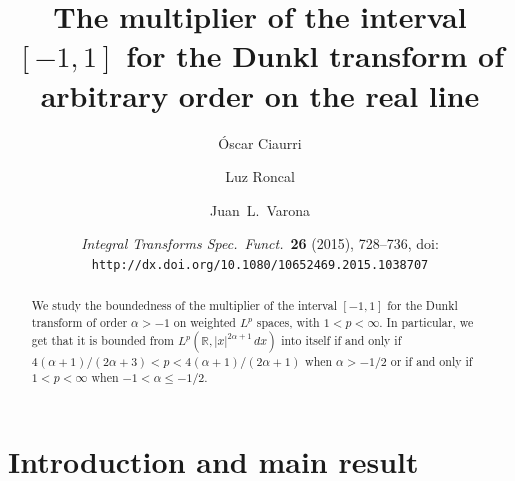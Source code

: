 \documentclass[a4paper]{amsart}
\numberwithin{equation}{section}
\theoremstyle{plain}
\theoremstyle{remark}
\begin{document}
\title[The multiplier of {$[-1,1]$} for the Dunkl transform]%
{The multiplier of the interval $[-1,1]$ for the Dunkl transform of arbitrary order on the real line}

\author[\'O. Ciaurri]{\'Oscar Ciaurri}
\address{Departamento de Matem\'aticas y Computaci\'on,
Universidad de La Rioja, 26004 Lo\-gro\-\~no, Spain}

\author[L. Roncal]{Luz Roncal}
\address{Departamento de Matem\'aticas y Computaci\'on,
Universidad de La Rioja, 26004 Lo\-gro\-\~no, Spain}

\author[J. L. Varona]{Juan~L.~Varona}
\address{Departamento de Matem\'aticas y Computaci\'on,
Universidad de La Rioja, 26004 Lo\-gro\-\~no, Spain}


\renewcommand{\datename}{\textbf{THIS PAPER HAS BEEN PUBLISHED IN}:}
\date{\textit{Integral Transforms Spec.\ Funct.}\ \textbf{26} (2015), 728--736,
doi: \texttt{http://dx.doi.org/10.1080/10652469.2015.1038707}}



\begin{abstract}
We study the boundedness of the multiplier of the interval $[-1,1]$ for the Dunkl transform of order $\alpha > -1$ on weighted $L^p$ spaces, with $1<p<\infty$. In particular, we get that it is bounded from $L^p(\mathbb{R},|x|^{2\alpha+1}\,dx)$ into itself if and only if $4(\alpha+1)/(2\alpha+3) < p < 4(\alpha+1)/(2\alpha+1)$ when $\alpha > -1/2$ or if and only if $1 < p < \infty$ when $-1 < \alpha \le -1/2$.
\end{abstract}

\maketitle

\section{Introduction and main result}
\end{document}
